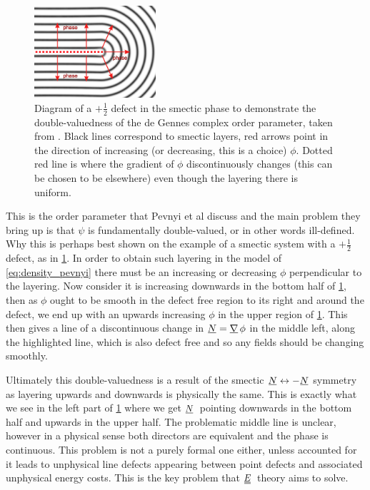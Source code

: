 \documentclass[12pt]{article}
\newcommand{\suf}[2]{\stackunder[0.5pt]{\stackunder[1pt]{\ensuremath{#1}}{\rule{\widthof{\ensuremath{#2}}*\real{0.9}}{.1ex}}}{}}
\newcommand{\duf}[2]{\stackunder[0.5pt]{\stackunder[0.8pt]{\stackunder[1pt]{\ensuremath{#1}}{\rule{\widthof{\ensuremath{#2}}*\real{0.9}}{.1ex}}}{\rule{\widthof{\ensuremath{#2}}*\real{0.9}}{.1ex}}}{}}
\newcommand{\su}[1]{\suf{#1}{#1}}
\newcommand{\du}[1]{\duf{#1}{#1}}
\newcommand{\mgrad}{\ensuremath{\suf{\nabla}{K}\,}}
\newcommand{\NN}{\ensuremath{\su{N}}}
\newcommand{\EE}{\ensuremath{\du{E}}}
\begin{document}
        \begin{figure}[t]
            \begin{center}
                \includegraphics[width=0.4\textwidth]{figures/pevnyi.pdf}
            \end{center}
            \caption{
                Diagram of a $+\frac{1}{2}$ defect in the smectic phase to demonstrate the double-valuedness of the de Gennes complex order parameter, taken from \cite{pevnyiModelingSmecticLayers2014}.
                Black lines correspond to smectic layers, red arrows point in the direction of increasing (or decreasing, this is a choice) $\phi$.
                Dotted red line is where the gradient of $\phi$ discontinuously changes (this can be chosen to be elsewhere) even though the layering there is uniform.
            }\label{fig:pevnyi}
        \end{figure}

        This is the order parameter that Pevnyi et al discuss and the main problem they bring up is that $\psi$ is fundamentally double-valued, or in other words ill-defined.
        Why this is perhaps best shown on the example of a smectic system with a $+\frac{1}{2}$ defect, as in \cref{fig:pevnyi}.
        In order to obtain such layering in the model of \cref{eq:density_pevnyi} there must be an increasing or decreasing $\phi$ perpendicular to the layering.
        Now consider it is increasing downwards in the bottom half of \cref{fig:pevnyi}, then as $\phi$ ought to be smooth in the defect free region to its right and around the defect, we end up with an upwards increasing $\phi$ in the upper region of \cref{fig:pevnyi}.
        This then gives a line of a discontinuous change in $\su{N} = \mgrad \phi$ in the middle left, along the highlighted line, which is also defect free and so any fields should be changing smoothly.

        Ultimately this double-valuedness is a result of the smectic $\su{N} \leftrightarrow -\su{N}$ symmetry as layering upwards and downwards is physically the same.
        This is exactly what we see in the left part of \cref{fig:pevnyi} where we get \NN\ pointing downwards in the bottom half and upwards in the upper half.
        The problematic middle line is unclear, however in a physical sense both directors are equivalent and the phase is continuous.
        This problem is not a purely formal one either, unless accounted for it leads to unphysical line defects appearing between point defects\cite{pevnyiModelingSmecticLayers2014} and associated unphysical energy costs.
        This is the key problem that \EE\ theory aims to solve.
\end{document}
